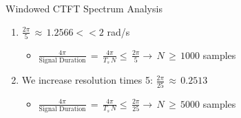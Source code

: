 \documentclass{beamer}
\begin{document}
\begin{frame}[t,allowframebreaks]{Windowed CTFT Spectrum Analysis}
\begin{itemize}
	\begin{enumerate}
	\item $\displaystyle\frac{2 \pi}{5} \, \approx \, 1.2566 <<  2$ rad/s
	
		\begin{itemize}
		\item $\displaystyle\frac{4 \pi}{\text{Signal Duration}} \, = \,   \displaystyle\frac{4 \pi}{T_s \, N} \leq \, \displaystyle\frac{2 \pi}{5} \rightarrow \, N \, \geq \, 1000 $ samples
		\end{itemize}
		
	\item We increase resolution times 5: $\displaystyle\frac{2 \pi}{25} \, \approx \, 0.2513$
	
	\begin{itemize}
		\item $\displaystyle\frac{4 \pi}{\text{Signal Duration}} \, = \,   \displaystyle\frac{4 \pi}{T_s \, N} \leq \, \displaystyle\frac{2 \pi}{25} \rightarrow \, N \, \geq \, 5000 $ samples
		\end{itemize}

	\end{enumerate}

\end{itemize}



\end{frame}
\end{document}

